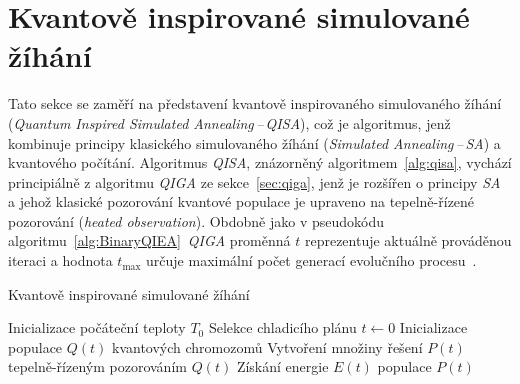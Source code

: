 \section{Kvantově inspirované simulované žíhání}\label{sec:qisa}
Tato sekce se zaměří na představení kvantově inspirovaného simulovaného žíhání (\emph{Quantum Inspired Simulated Annealing\,--\,QISA}), což je algoritmus, jenž kombinuje principy klasického simulovaného žíhání (\emph{Simulated Annealing\,--\,SA}) a kvantového počítání. 
Algoritmus \emph{QISA}, znázorněný algoritmem~\ref{alg:qisa}, vychází principiálně z algoritmu \emph{QIGA} ze sekce~\ref{sec:qiga}, jenž je rozšířen o principy \emph{SA} a jehož klasické pozorování kvantové populace je upraveno na tepelně-řízené pozorování (\emph{heated observation}). 
Obdobně jako v pseudokódu algoritmu~\ref{alg:BinaryQIEA}~\emph{QIGA} proměnná $t$ reprezentuje aktuálně prováděnou iteraci a hodnota $t_{\text{max}}$ určuje maximální počet generací evolučního procesu~\cite{qisa}. 

\begin{algorithm}[ht]
    \caption{Kvantově inspirované simulované žíhání~\cite{qisa}}
    \label{alg:qisa}
    Inicializace počáteční teploty $T_0$\;
    Selekce chladicího plánu\;
    $t \gets 0$\;
    Inicializace populace $Q\left(t\right)$ kvantových chromozomů\;
    Vytvoření množiny řešení $P\left(t\right)$ tepelně-řízeným pozorováním $Q\left(t\right)$\;
    Získání energie $E\left(t\right)$ populace $P\left(t\right)$\;
\end{algorithm}


